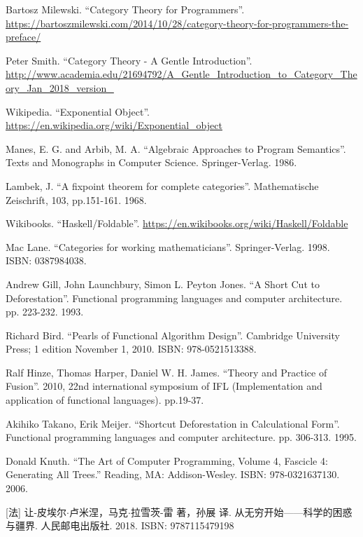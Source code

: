 \documentclass{article}
\begin{document}
\begin{thebibliography}{99}
Bartosz Milewski. ``Category Theory for Programmers''. \url{https://bartoszmilewski.com/2014/10/28/category-theory-for-programmers-the-preface/}

Peter Smith. ``Category Theory - A Gentle Introduction''. \url{http://www.academia.edu/21694792/A_Gentle_Introduction_to_Category_Theory_Jan_2018_version_}

Wikipedia. ``Exponential Object''. \url{https://en.wikipedia.org/wiki/Exponential_object}

Manes, E. G. and Arbib, M. A. ``Algebraic Approaches to Program Semantics''. Texts and Monographs in Computer Science. Springer-Verlag. 1986.

Lambek, J. ``A fixpoint theorem for complete categories''. Mathematische Zeischrift, 103, pp.151-161. 1968.

Wikibooks. ``Haskell/Foldable''. \url{https://en.wikibooks.org/wiki/Haskell/Foldable}

Mac Lane. ``Categories for working mathematicians''. Springer-Verlag. 1998. ISBN: 0387984038.


Andrew Gill, John Launchbury, Simon L. Peyton Jones. ``A Short Cut to Deforestation''. Functional programming languages and computer architecture. pp. 223-232. 1993.

Richard Bird. ``Pearls of Functional Algorithm Design''. Cambridge University Press; 1 edition November 1, 2010. ISBN: 978-0521513388.

Ralf Hinze, Thomas Harper, Daniel W. H. James. ``Theory and Practice of Fusion''. 2010, 22nd international symposium of IFL (Implementation and application of functional languages). pp.19-37.

Akihiko Takano, Erik Meijer. ``Shortcut Deforestation in Calculational Form''. Functional programming languages and computer architecture. pp. 306-313. 1995.

Donald Knuth. ``The Art of Computer Programming, Volume 4, Fascicle 4: Generating All Trees.'' Reading, MA: Addison-Wesley. ISBN: 978-0321637130. 2006.

[法] 让-皮埃尔$\cdot$卢米涅，马克$\cdot$拉雪茨-雷 著，孙展 译. 从无穷开始——科学的困惑与疆界. 人民邮电出版社. 2018. ISBN: 9787115479198


\end{thebibliography}
\end{document}
